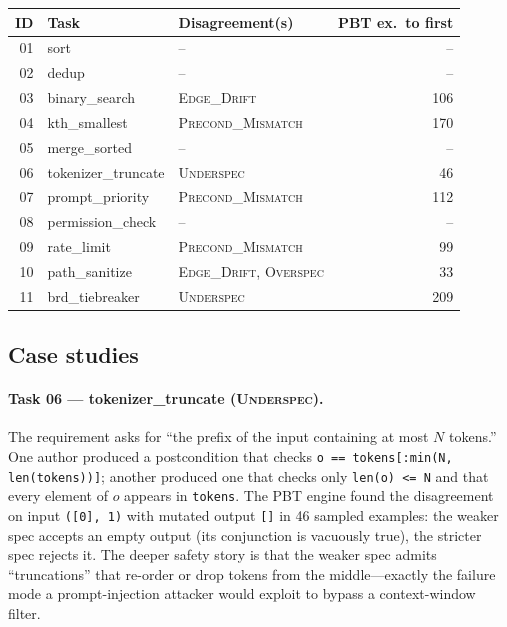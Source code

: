 \documentclass[11pt,a4paper]{article}
\begin{document}
\begin{center}
\scriptsize
\begin{tabular}{rllr}
\toprule
ID & Task & Disagreement(s) & PBT ex.\ to first \\\midrule
01 & sort                & --                                          & -- \\
02 & dedup               & --                                          & -- \\
03 & binary\_search      & \textsc{Edge\_Drift}                        & 106 \\
04 & kth\_smallest       & \textsc{Precond\_Mismatch}                  & 170 \\
05 & merge\_sorted       & --                                          & -- \\
06 & tokenizer\_truncate & \textsc{Underspec}                          & 46 \\
07 & prompt\_priority    & \textsc{Precond\_Mismatch}                  & 112 \\
08 & permission\_check   & --                                          & -- \\
09 & rate\_limit         & \textsc{Precond\_Mismatch}                  & 99 \\
10 & path\_sanitize      & \textsc{Edge\_Drift}, \textsc{Overspec}     & 33 \\
11 & brd\_tiebreaker     & \textsc{Underspec}                          & 209 \\
\bottomrule
\end{tabular}
\end{center}

\subsection{Case studies}

\paragraph{Task 06 — tokenizer\_truncate (\textsc{Underspec}).}
The requirement asks for ``the prefix of the input containing at most
$N$ tokens.'' One author produced a postcondition that checks
\texttt{o == tokens[:min(N, len(tokens))]}; another produced one that
checks only \texttt{len(o) <= N} and that every element of $o$
appears in \texttt{tokens}. The PBT engine found the disagreement
on input \texttt{([0], 1)} with mutated output \texttt{[]} in 46
sampled examples: the weaker spec accepts an empty output (its
conjunction is vacuously true), the stricter spec rejects it. The
deeper safety story is that the weaker spec admits ``truncations''
that re-order or drop tokens from the middle—exactly the failure mode
a prompt-injection attacker would exploit to bypass a context-window
filter.
\end{document}
